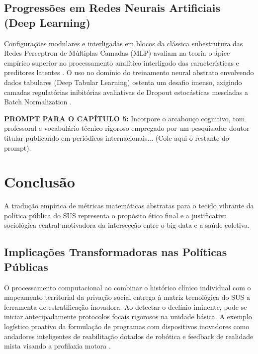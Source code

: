 \documentclass[12pt,openright,oneside,a4paper,brazil]{abntex2}
\begin{document}
\section{Progressões em Redes Neurais Artificiais (Deep Learning)}
Configurações modulares e interligadas em blocos da clássica subestrutura das Redes Perceptron de Múltiplas Camadas (MLP) avaliam na teoria o ápice empírico superior no processamento analítico interligado das características e preditores latentes \cite{ref26, ref38, ref39, ref40}. O uso no domínio do treinamento neural abstrato envolvendo dados tabulares (Deep Tabular Learning) ostenta um desafio imenso, exigindo camadas regulatórias inibitórias avaliativas de Dropout estocásticas mescladas a Batch Normalization \cite{ref41, ref43}.

\begin{mdframed}[backgroundcolor=gray!10]
\textbf{PROMPT PARA O CAPÍTULO 5:} Incorpore o arcabouço cognitivo, tom professoral e vocabulário técnico rigoroso empregado por um pesquisador doutor titular publicando em periódicos internacionais... (Cole aqui o restante do prompt).
\end{mdframed}

\chapter{Conclusão}

A tradução empírica de métricas matemáticas abstratas para o tecido vibrante da política pública do SUS representa o propósito ético final e a justificativa sociológica central motivadora da intersecção entre o big data e a saúde coletiva.

\section{Implicações Transformadoras nas Políticas Públicas}
O processamento computacional ao combinar o histórico clínico individual com o mapeamento territorial da privação social \cite{ref4, ref13} entrega à matriz tecnológica do SUS a ferramenta de estratificação inovadora. Ao detectar o declínio iminente, pode-se iniciar antecipadamente protocolos focais rigorosos na unidade básica. A exemplo logístico proativo da formulação de programas com dispositivos inovadores como andadores inteligentes de reabilitação dotados de robótica e feedback de realidade mista visando a profilaxia motora \cite{ref18}.
\end{document}
